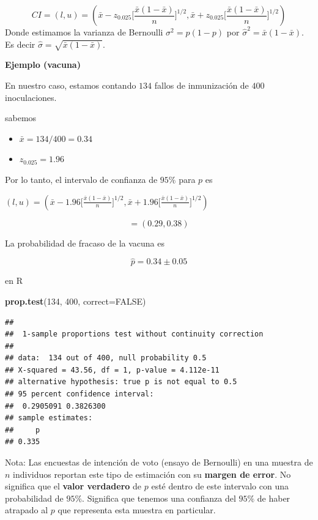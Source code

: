 \documentclass[
]{book}
\newenvironment{Shaded}{\begin{snugshade}}{\end{snugshade}}
\newcommand{\AttributeTok}[1]{\textcolor[rgb]{0.13,0.29,0.53}{#1}}
\newcommand{\ConstantTok}[1]{\textcolor[rgb]{0.56,0.35,0.01}{#1}}
\newcommand{\DecValTok}[1]{\textcolor[rgb]{0.00,0.00,0.81}{#1}}
\newcommand{\FunctionTok}[1]{\textcolor[rgb]{0.13,0.29,0.53}{\textbf{#1}}}
\newcommand{\NormalTok}[1]{#1}
\providecommand{\tightlist}{%
  \setlength{\itemsep}{0pt}\setlength{\parskip}{0pt}}
\begin{document}
\[CI=(l,u)=(\bar{x}-z_{0.025}\big[\frac{\bar{x}(1-\bar{x})}{n} \big]^{ 1/2}, \bar{x}+z_{0.025}\big[\frac{\bar{x}(1-\bar{x})}{n} \big]^{1/2})\]
Donde estimamos la varianza de Bernoulli \(\sigma^2=p(1-p)\) por \(\hat{\sigma}^2=\bar{x}(1-\bar{x})\). Es decir \(\hat{\sigma}=\sqrt{\bar{x}(1-\bar{x})}\).

\textbf{Ejemplo (vacuna)}

En nuestro caso, estamos contando \(134\) fallos de inmunización de \(400\) inoculaciones.

sabemos

\begin{itemize}
\tightlist
\item
  \(\bar{x}=134/400=0.34\)
\item
  \(z_{0.025}=1.96\)
\end{itemize}

Por lo tanto, el intervalo de confianza de \(95\%\) para \(p\) es

\((l,u)=(\bar{x}-1.96 \big[\frac{\bar{x}(1-\bar{x})}{n} \big]^{1/2}, \bar{x}+1.96 \big[\frac{\bar{x}(1-\bar{x})}{n} \big]^{1/2})\)

\[=(0.29,0.38)\]

La probabilidad de fracaso de la vacuna es

\[\hat{p}=0.34 \pm 0.05\]

en R

\begin{Shaded}
\begin{Highlighting}[]
\FunctionTok{prop.test}\NormalTok{(}\DecValTok{134}\NormalTok{, }\DecValTok{400}\NormalTok{, }\AttributeTok{correct=}\ConstantTok{FALSE}\NormalTok{)}
\end{Highlighting}
\end{Shaded}

\begin{verbatim}
## 
##  1-sample proportions test without continuity correction
## 
## data:  134 out of 400, null probability 0.5
## X-squared = 43.56, df = 1, p-value = 4.112e-11
## alternative hypothesis: true p is not equal to 0.5
## 95 percent confidence interval:
##  0.2905091 0.3826300
## sample estimates:
##     p 
## 0.335
\end{verbatim}

Nota: Las encuestas de intención de voto (ensayo de Bernoulli) en una muestra de \(n\) individuos reportan este tipo de estimación con su \textbf{margen de error}. No significa que el \textbf{valor verdadero} de \(p\) esté dentro de este intervalo con una probabilidad de \(95\%\). Significa que tenemos una confianza del \(95\%\) de haber atrapado al \(p\) que representa esta muestra en particular.
\end{document}
